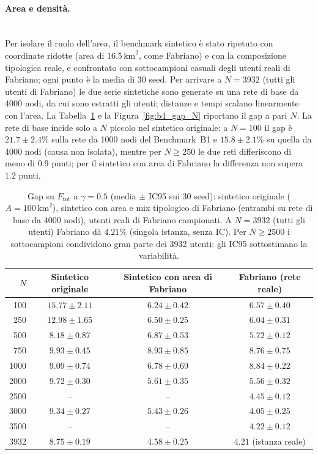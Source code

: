 \paragraph{Area e densità.}\mbox{}\\
Per isolare il ruolo dell'area, il benchmark sintetico è stato ripetuto con coordinate ridotte (area di $16.5\,\mathrm{km}^2$, come Fabriano) e con la composizione tipologica reale, e confrontato con sottocampioni casuali degli utenti reali di Fabriano; ogni punto è la media di 30 seed. Per arrivare a $N=3932$ (tutti gli utenti di Fabriano) le due serie sintetiche sono generate su una rete di base da 4000 nodi, da cui sono estratti gli utenti; distanze e tempi scalano linearmente con l'area. La Tabella~\ref{tab:b4_gap} e la Figura~\ref{fig:b4_gap_N} riportano il gap a pari $N$. La rete di base incide solo a $N$ piccolo nel sintetico originale: a $N=100$ il gap è $21.7\pm2.4\%$ sulla rete da 1000 nodi del Benchmark~B1 e $15.8\pm2.1\%$ su quella da 4000 nodi (causa non isolata), mentre per $N\ge250$ le due reti differiscono di meno di $0.9$ punti; per il sintetico con area di Fabriano la differenza non supera $1.2$ punti.


\begin{table}[htbp]
	\centering
	\caption{Gap su $F_{\mathrm{tot}}$ a $\gamma=0.5$ (media $\pm$ IC95 sui 30 seed): sintetico originale ($A=100\,\mathrm{km}^2$), sintetico con area e mix tipologico di Fabriano (entrambi su rete di base da 4000 nodi), utenti reali di Fabriano campionati. A $N=3932$ (tutti gli utenti) Fabriano dà $4.21\%$ (singola istanza, senza IC). Per $N\ge2500$ i sottocampioni condividono gran parte dei 3932 utenti: gli IC95 sottostimano la variabilità.}
	\label{tab:b4_gap}
	\small
	\begin{tabular}{rccc}
		\hline
		$N$ & Sintetico originale & Sintetico con area di Fabriano & Fabriano (rete reale) \\
		\hline
		100  & $15.77\pm2.11$ & $6.24\pm0.42$ & $6.57\pm0.40$ \\
		250  & $12.98\pm1.65$ & $6.50\pm0.25$ & $6.04\pm0.31$ \\
		500  & $8.18\pm0.87$  & $6.87\pm0.53$ & $5.72\pm0.12$ \\
		750  & $9.93\pm0.45$  & $8.93\pm0.85$ & $8.76\pm0.75$ \\
		1000 & $9.09\pm0.74$  & $6.78\pm0.69$ & $8.84\pm0.22$ \\
		2000 & $9.72\pm0.30$  & $5.61\pm0.35$ & $5.56\pm0.32$ \\
		2500 & --             & --            & $4.45\pm0.12$ \\
		3000 & $9.34\pm0.27$  & $5.43\pm0.26$ & $4.05\pm0.25$ \\
		3500 & --             & --            & $4.22\pm0.12$ \\
		3932 & $8.75\pm0.19$  & $4.58\pm0.25$ & $4.21$ (istanza reale) \\
		\hline
	\end{tabular}
\end{table}

